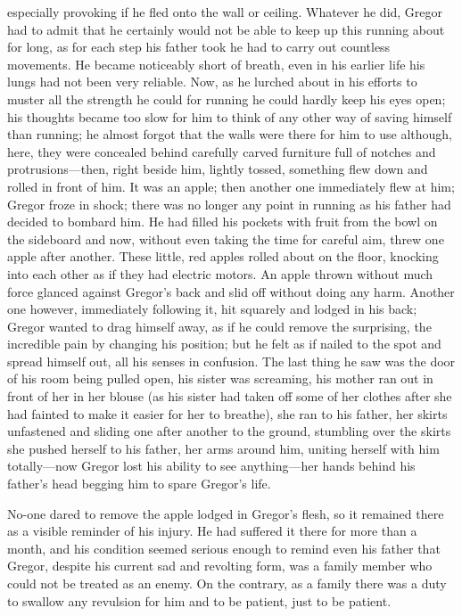 especially provoking if he fled onto the wall or ceiling. Whatever he
did, Gregor had to admit that he certainly would not be able to keep up
this running about for long, as for each step his father took he had to
carry out countless movements. He became noticeably short of breath,
even in his earlier life his lungs had not been very reliable. Now, as
he lurched about in his efforts to muster all the strength he could for
running he could hardly keep his eyes open; his thoughts became too
slow for him to think of any other way of saving himself than running;
he almost forgot that the walls were there for him to use although,
here, they were concealed behind carefully carved furniture full of
notches and protrusions—then, right beside him, lightly tossed,
something flew down and rolled in front of him. It was an apple; then
another one immediately flew at him; Gregor froze in shock; there was
no longer any point in running as his father had decided to bombard
him. He had filled his pockets with fruit from the bowl on the
sideboard and now, without even taking the time for careful aim, threw
one apple after another. These little, red apples rolled about on the
floor, knocking into each other as if they had electric motors. An
apple thrown without much force glanced against Gregor’s back and slid
off without doing any harm. Another one however, immediately following
it, hit squarely and lodged in his back; Gregor wanted to drag himself
away, as if he could remove the surprising, the incredible pain by
changing his position; but he felt as if nailed to the spot and spread
himself out, all his senses in confusion. The last thing he saw was the
door of his room being pulled open, his sister was screaming, his
mother ran out in front of her in her blouse (as his sister had taken
off some of her clothes after she had fainted to make it easier for her
to breathe), she ran to his father, her skirts unfastened and sliding
one after another to the ground, stumbling over the skirts she pushed
herself to his father, her arms around him, uniting herself with him
totally—now Gregor lost his ability to see anything—her hands behind
his father’s head begging him to spare Gregor’s life.

\endchapter


No-one dared to remove the apple lodged in Gregor’s flesh, so it
remained there as a visible reminder of his injury. He had suffered it
there for more than a month, and his condition seemed serious enough to
remind even his father that Gregor, despite his current sad and
revolting form, was a family member who could not be treated as an
enemy. On the contrary, as a family there was a duty to swallow any
revulsion for him and to be patient, just to be patient.

